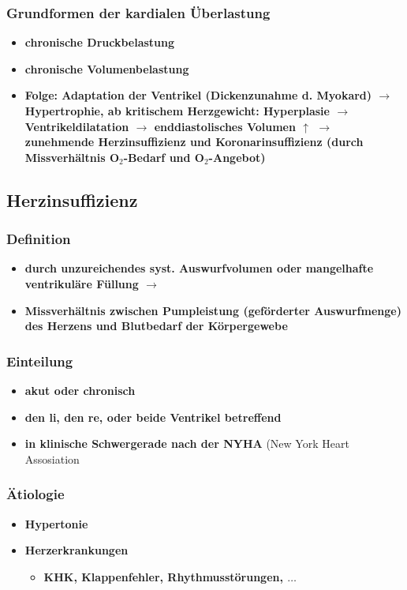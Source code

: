 		\subsubsection{Grundformen der kardialen Überlastung}
			\begin{itemize}
				\item \textbf{chronische Druckbelastung}
				\item \textbf{chronische Volumenbelastung}
				\item \textbf{Folge: Adaptation der Ventrikel (Dickenzunahme d. Myokard)  $\rightarrow$  Hypertrophie, ab kritischem Herzgewicht: Hyperplasie  $\rightarrow$ Ventrikeldilatation  $\rightarrow$  enddiastolisches Volumen $\uparrow$ $\rightarrow$  zunehmende Herzinsuffizienz und Koronarinsuffizienz (durch Missverhältnis O$_2$-Bedarf und  O$_2$-Angebot) }
			\end{itemize}
	\subsection{Herzinsuffizienz}
		\subsubsection{Definition}
			\begin{itemize}
				\item \textbf{durch unzureichendes syst. Auswurfvolumen oder mangelhafte ventrikuläre Füllung $\rightarrow$}
				\item \textbf{Missverhältnis zwischen Pumpleistung (geförderter Auswurfmenge) des Herzens und Blutbedarf der Körpergewebe}
			\end{itemize}
		\subsubsection{Einteilung}
			\begin{itemize}
				\item \textbf{akut oder chronisch}
				\item \textbf{den li, den re, oder beide Ventrikel betreffend}
				\item \textbf{in klinische Schwergerade nach der NYHA} (New York Heart Assosiation
			\end{itemize}
		\subsubsection{Ätiologie}
			\begin{itemize}
				\item \textbf{Hypertonie}
				\item \textbf{Herzerkrankungen}
					\begin{itemize}
						\item \textbf{KHK, Klappenfehler, Rhythmusstörungen, $\dots$}
					\end{itemize}
			\end{itemize}
